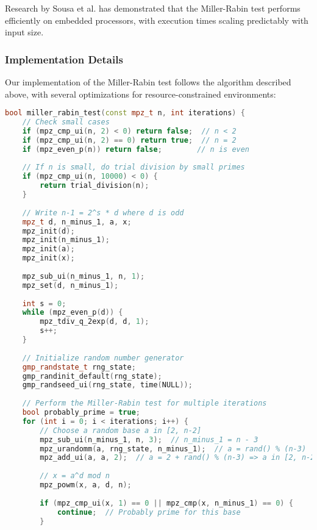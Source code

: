 Research by Sousa et al. \cite{taxonomy_primality} has demonstrated that the Miller-Rabin test performs efficiently on embedded processors, with execution times scaling predictably with input size.

\subsubsection{Implementation Details}

Our implementation of the Miller-Rabin test follows the algorithm described above, with several optimizations for resource-constrained environments:

\begin{lstlisting}[language=C++, caption=Miller-Rabin Primality Test Implementation]
bool miller_rabin_test(const mpz_t n, int iterations) {
    // Check small cases
    if (mpz_cmp_ui(n, 2) < 0) return false;  // n < 2
    if (mpz_cmp_ui(n, 2) == 0) return true;  // n = 2
    if (mpz_even_p(n)) return false;        // n is even
    
    // If n is small, do trial division by small primes
    if (mpz_cmp_ui(n, 10000) < 0) {
        return trial_division(n);
    }
    
    // Write n-1 = 2^s * d where d is odd
    mpz_t d, n_minus_1, a, x;
    mpz_init(d);
    mpz_init(n_minus_1);
    mpz_init(a);
    mpz_init(x);
    
    mpz_sub_ui(n_minus_1, n, 1);
    mpz_set(d, n_minus_1);
    
    int s = 0;
    while (mpz_even_p(d)) {
        mpz_tdiv_q_2exp(d, d, 1);
        s++;
    }
    
    // Initialize random number generator
    gmp_randstate_t rng_state;
    gmp_randinit_default(rng_state);
    gmp_randseed_ui(rng_state, time(NULL));
    
    // Perform the Miller-Rabin test for multiple iterations
    bool probably_prime = true;
    for (int i = 0; i < iterations; i++) {
        // Choose a random base a in [2, n-2]
        mpz_sub_ui(n_minus_1, n, 3);  // n_minus_1 = n - 3
        mpz_urandomm(a, rng_state, n_minus_1);  // a = rand() % (n-3)
        mpz_add_ui(a, a, 2);  // a = 2 + rand() % (n-3) => a in [2, n-2]
        
        // x = a^d mod n
        mpz_powm(x, a, d, n);
        
        if (mpz_cmp_ui(x, 1) == 0 || mpz_cmp(x, n_minus_1) == 0) {
            continue;  // Probably prime for this base
        }
        

\end{lstlisting}
